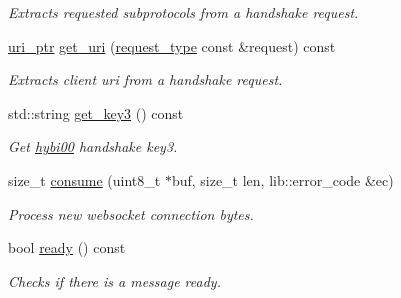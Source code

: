 \begin{DoxyCompactItemize}
\begin{DoxyCompactList}\small\item\em Extracts requested subprotocols from a handshake request. \end{DoxyCompactList}\item 
\mbox{\label{classwebsocketpp_1_1processor_1_1hybi00_aa490b9d9905915023b5f2e42aac59127}} 
\mbox{\hyperlink{namespacewebsocketpp_aae370ea5ac83a8ece7712cb39fc23f5b}{uri\+\_\+ptr}} \mbox{\hyperlink{classwebsocketpp_1_1processor_1_1hybi00_aa490b9d9905915023b5f2e42aac59127}{get\+\_\+uri}} (\mbox{\hyperlink{classwebsocketpp_1_1http_1_1parser_1_1request}{request\+\_\+type}} const \&request) const
\begin{DoxyCompactList}\small\item\em Extracts client uri from a handshake request. \end{DoxyCompactList}\item 
std\+::string \mbox{\hyperlink{classwebsocketpp_1_1processor_1_1hybi00_a684fe59a368d586593b1c9b97ac8526d}{get\+\_\+key3}} () const
\begin{DoxyCompactList}\small\item\em Get \mbox{\hyperlink{classwebsocketpp_1_1processor_1_1hybi00}{hybi00}} handshake key3. \end{DoxyCompactList}\item 
\mbox{\label{classwebsocketpp_1_1processor_1_1hybi00_a8065338a7a9c760a92ce24d736a3dff2}} 
size\+\_\+t \mbox{\hyperlink{classwebsocketpp_1_1processor_1_1hybi00_a8065338a7a9c760a92ce24d736a3dff2}{consume}} (uint8\+\_\+t $\ast$buf, size\+\_\+t len, lib\+::error\+\_\+code \&ec)
\begin{DoxyCompactList}\small\item\em Process new websocket connection bytes. \end{DoxyCompactList}\item 
bool \mbox{\hyperlink{classwebsocketpp_1_1processor_1_1hybi00_a8a0ebdb322dad95ea3c7aee8e5c56b9a}{ready}} () const
\begin{DoxyCompactList}\small\item\em Checks if there is a message ready. \end{DoxyCompactList}\item 
\mbox{\label{classwebsocketpp_1_1processor_1_1hybi00_a86ed2943be17c9775153a9731289c16e}} 

\end{DoxyCompactItemize}
